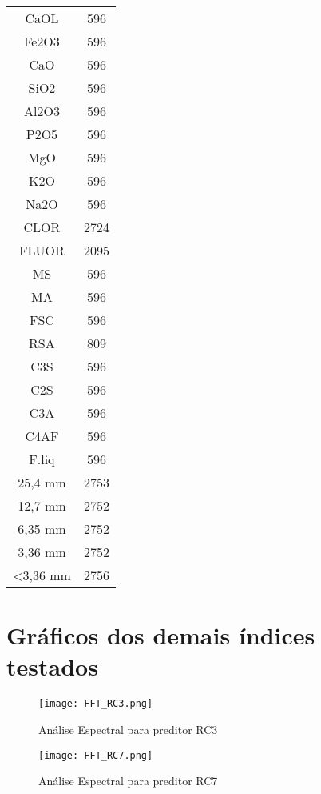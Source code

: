 \newpage
{}
\begin{center}
\begin{tabular}{ c c }
 CaOL       &      596\\
Fe2O3       &    596\\
CaO         &   596\\
SiO2        &  596\\
Al2O3       & 596\\
P2O5        & 596\\
MgO         & 596\\
K2O         & 596\\
Na2O        & 596\\
CLOR        & 2724\\
FLUOR       & 2095\\
MS          & 596\\
MA          & 596\\
FSC         & 596\\
RSA         & 809\\
C3S         & 596\\
C2S         & 596\\
C3A         & 596\\
C4AF        & 596\\
F.liq       & 596\\
25,4 mm     & 2753\\
12,7 mm     & 2752\\
6,35  mm    & 2752\\
3,36 mm     & 2752\\
\textless 3,36 mm    & 2756
\end{tabular}
\end{center}

\chapter{Gráficos dos demais índices testados}
\label{ape:graphs}


\begin{figure}[H]
\centering
\texttt{[image: FFT\_RC3.png]}
\caption{Análise Espectral para preditor RC3}
\end{figure}

\begin{figure}[H]
\centering
\texttt{[image: FFT\_RC7.png]}
\caption{Análise Espectral para preditor RC7}
\end{figure}

